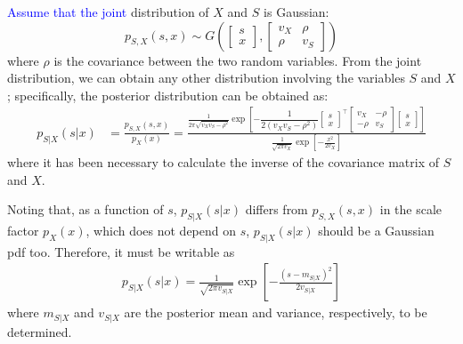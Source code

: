\textcolor{blue}{Assume that the joint} distribution of $X$ and $S$ is Gaussian:
\begin{equation}
p_{S,X}(s,x) \sim G\left(\begin{bmatrix} s \\ x \end{bmatrix},
                         \begin{bmatrix} v_X & \rho \\ \rho & v_S \end{bmatrix}\right)
\end{equation}
where $\rho$ is the covariance between the two random variables. From the joint distribution, we can obtain any other distribution involving the variables $S$ and $X$; specifically, the posterior distribution can be obtained as:
\begin{align}
\label{Est_psxgauss}
p_{S|X}(s|x) 
	&= \frac{p_{S,X}(s,x)}{p_X(x)} 
	 = \frac{\frac{1}{2\pi \sqrt{v_X v_S - \rho^2}}
	         \exp\left[-\dfrac{1}{2(v_X v_S - \rho^2)} 
	         			\begin{bmatrix} s \\ x \end{bmatrix}^\intercal
	                    \begin{bmatrix} v_X & -\rho \\ -\rho & v_S \end{bmatrix} 
	                    \begin{bmatrix} s \\ x \end{bmatrix}\right]}
	        {\frac{1}{\sqrt{2\pi v_X}} \exp\left[-\frac{x^2}{2 v_X}\right]}
\end{align}
where it has been necessary to calculate the inverse of the covariance matrix of $S$ and $X$. 

{Noting that, as a function of $s$, $p_{S|X}(s|x)$ differs from $p_{S,X}(s,x)$ in the scale factor $p_X(x)$, which does not depend on $s$,  $p_{S|X}(s|x)$ should be a Gaussian pdf too. Therefore, it must be writable as
\begin{align}
\label{Est_postsxgauss}
p_{S|X}(s|x) = \frac{1}{\sqrt{2\pi v_{S|X}}} \exp\left[ -\frac{(s - m_{S|X})^2}{2 v_{S|X}}\right] 
\end{align}
where $m_{S|X}$ and $v_{S|X}$ are the posterior mean and variance, respectively, to be determined.}

